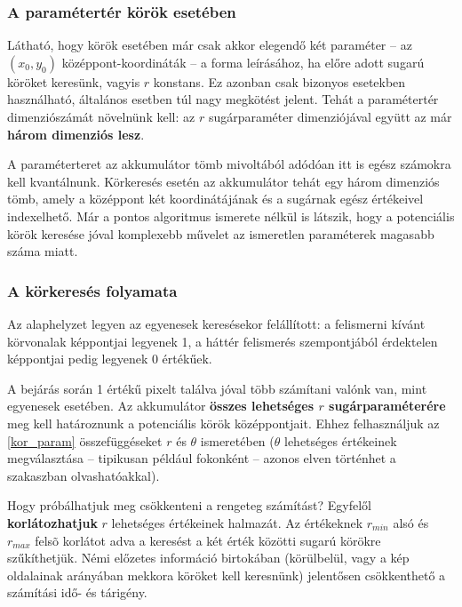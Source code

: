 \subsubsection{A paramétertér körök esetében}\label{sect:korok_parameterter}

Látható, hogy körök esetében már csak akkor elegendő két paraméter -- az $ (x_{0}, y_{0}) $ középpont-koordináták -- a forma leírásához, ha előre adott sugarú köröket keresünk, vagyis $ r $ konstans. Ez azonban csak bizonyos esetekben használható, általános esetben túl nagy megkötést jelent. Tehát a paramétertér dimenziószámát növelnünk kell: az $ r $ sugárparaméter dimenziójával együtt az már \textbf{három dimenziós lesz}.

A paraméterteret az akkumulátor tömb mivoltából adódóan itt is egész számokra kell kvantálnunk. Körkeresés esetén az akkumulátor tehát egy három dimenziós tömb, amely a középpont két koordinátájának és a sugárnak egész értékeivel indexelhető. Már a pontos algoritmus ismerete nélkül is látszik, hogy a potenciális körök keresése jóval komplexebb művelet az ismeretlen paraméterek magasabb száma miatt.

\subsubsection{A körkeresés folyamata}\label{sect:korok_keresese}

Az alaphelyzet legyen az egyenesek keresésekor felállított: a felismerni kívánt körvonalak képpontjai legyenek 1, a háttér felismerés szempontjából érdektelen képpontjai pedig legyenek 0 értékűek.

A bejárás során 1 értékű pixelt találva jóval több számítani valónk van, mint egyenesek esetében. Az akkumulátor \textbf{összes lehetséges $ r $ sugárparaméterére} meg kell határoznunk a potenciális körök középpontjait. Ehhez felhasználjuk az \eqref{kor_param} összefüggéseket $ r $ és $ \theta $ ismeretében ($ \theta $ lehetséges értékeinek megválasztása -- tipikusan például fokonként -- azonos elven történhet a  szakaszban olvashatóakkal).

Hogy próbálhatjuk meg csökkenteni a rengeteg számítást? Egyfelől \textbf{korlátozhatjuk} $ r $ lehetséges értékeinek halmazát. Az értékeknek $ r_{min} $ alsó és $ r_{max} $ felsõ korlátot adva a keresést a két érték közötti sugarú körökre szűkíthetjük. Némi előzetes információ birtokában (körülbelül, vagy a kép oldalainak arányában mekkora köröket kell keresnünk) jelentősen csökkenthető a számítási idő- és tárigény.

